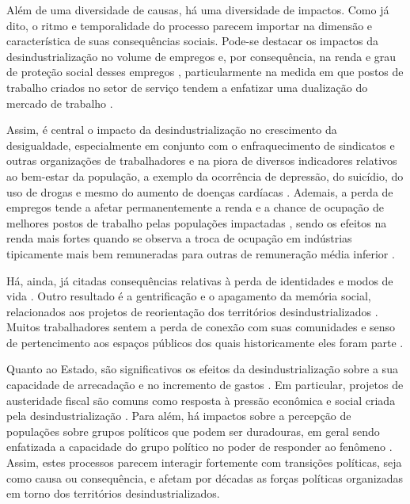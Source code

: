 Além de uma diversidade de causas, há uma diversidade de impactos. Como
já dito, o ritmo e temporalidade do processo parecem importar na
dimensão e característica de suas consequências sociais. Pode-se
destacar os impactos da desindustrialização no volume de empregos e, por
consequência, na renda e grau de proteção social desses empregos
\citep{beatty_long_2020}, particularmente na medida em que postos de trabalho criados no
setor de serviço tendem a enfatizar uma dualização do mercado de
trabalho \citep[p.~84--86]{lee_institutional_2016}.

Assim, é central o impacto da desindustrialização no crescimento da
desigualdade, especialmente em conjunto com o enfraquecimento de
sindicatos e outras organizações de trabalhadores
\citep{kollmeyer_trade_2018} e
na piora de diversos indicadores relativos ao bem-estar da população, a
exemplo da ocorrência de depressão, do suicídio, do uso de drogas e
mesmo do aumento de doenças cardíacas
\citep{scheiring_deindustrialization_2023,winant_hard_2019}. Ademais, a perda de empregos tende a afetar
permanentemente a renda e a chance de ocupação de melhores postos de
trabalho pelas populações impactadas
\citep{berger_industrial_2022}, sendo os efeitos na renda mais fortes quando se observa a troca
de ocupação em indústrias tipicamente mais bem remuneradas para outras
de remuneração média inferior
\citep{bluestone_deindustrialization_1982,clark_voices_2020}.

Há, ainda, já citadas consequências relativas à perda de identidades e
modos de vida \citep{beatty_long_2020,linkon_half-life_2018,mah_industrial_2012}. Outro resultado é a
gentrificação e o apagamento da memória social, relacionados aos
projetos de reorientação dos territórios desindustrializados
\citep{lewis_regenerating_2016}. Muitos
trabalhadores sentem a perda de conexão com suas comunidades e senso de
pertencimento aos espaços públicos dos quais historicamente eles foram
parte \citep{clarke_closing_2015,phillips_closure_2015}.

Quanto ao Estado, são significativos os efeitos da desindustrialização
sobre a sua capacidade de arrecadação
\citep{highsmith_beyond_2014} e
no incremento de gastos
\citep{beatty_long_2020}. Em particular, projetos de austeridade fiscal são comuns como
resposta à pressão econômica e social criada pela desindustrialização
\citep{lawson_making_2020}. Para
além, há impactos sobre a percepção de populações sobre grupos políticos
que podem ser duradouras, em geral sendo enfatizada a capacidade do
grupo político no poder de responder ao fenômeno
\citep{phillips_deindustrialization_2019,scheiring_left_2020}. Assim, estes processos parecem
interagir fortemente com transições políticas, seja como causa ou
consequência, e afetam por décadas as forças políticas organizadas em
torno dos territórios desindustrializados.

